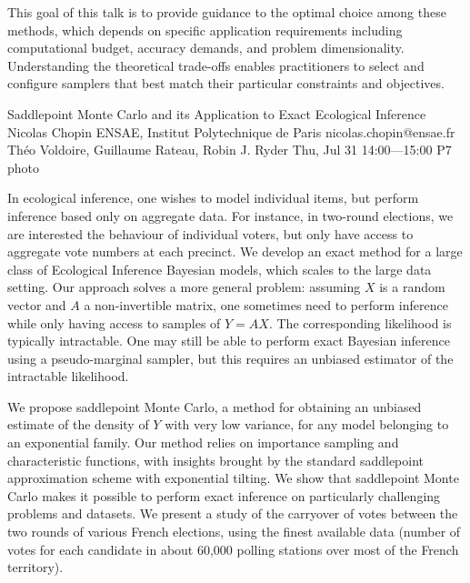 \begin{talk}
This goal of this talk is to provide
guidance to 
the optimal choice among these methods, which depends on specific application requirements including computational budget, accuracy demands, and problem dimensionality. Understanding the theoretical trade-offs enables practitioners to select and configure samplers that best match their particular constraints and objectives.

\vspace{-10ex}
\end{talk}

\clearpage
\begin{talk}
  {Saddlepoint Monte Carlo and its Application to Exact Ecological Inference}%
  {Nicolas Chopin}%
  {ENSAE, Institut Polytechnique de Paris}%
  {nicolas.chopin@ensae.fr}%
  {Th\'eo Voldoire, Guillaume Rateau, Robin J. Ryder}%
  {}%
  {Thu, Jul 31 14:00---15:00}%
  {P7}%
  {photo}%
  
    
   

In ecological inference, one wishes to model individual items, but perform
inference based only on aggregate data.  For instance, in two-round elections,
we are interested the behaviour of individual voters, but only have access to
aggregate vote numbers at each precinct.  We develop an exact method for a
large class of Ecological Inference Bayesian models, which scales  to the large
data setting.  Our approach solves a more general problem:  assuming $X$ is a
random vector and $A$ a non-invertible matrix, one sometimes need to perform
inference while only having access to samples of $Y=AX$. The corresponding
likelihood is typically intractable. One may still be able to perform exact
Bayesian inference using a pseudo-marginal sampler, but this requires an
unbiased estimator of the intractable likelihood.

We propose saddlepoint Monte Carlo, a method for obtaining an unbiased estimate
of the density of $Y$ with very low variance, for any model belonging to an
exponential family. Our method relies on importance sampling and 
characteristic functions, with insights brought by the standard saddlepoint
approximation scheme with exponential tilting.  We show that saddlepoint Monte
Carlo makes it possible to perform exact inference on particularly challenging
problems and datasets.  We present a study of the carryover of votes between
the two rounds of various French elections, using the finest available data
(number of votes for each candidate in about 60,000 polling stations over most
of the French territory). 


\end{talk}
